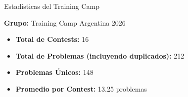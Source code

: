 \documentclass{beamer}
\begin{document}
\begin{frame}{Estadísticas del Training Camp}
\begin{center}
\Large
\textbf{Grupo:} Training Camp Argentina 2026

\vspace{0.3cm}

\normalsize
\begin{itemize}
\item \textbf{Total de Contests:} 16
\item \textbf{Total de Problemas (incluyendo duplicados):} 212
\item \textbf{Problemas Únicos:} 148
\item \textbf{Promedio por Contest:} 13.25 problemas
\end{itemize}

\end{center}
\end{frame}
\end{document}
